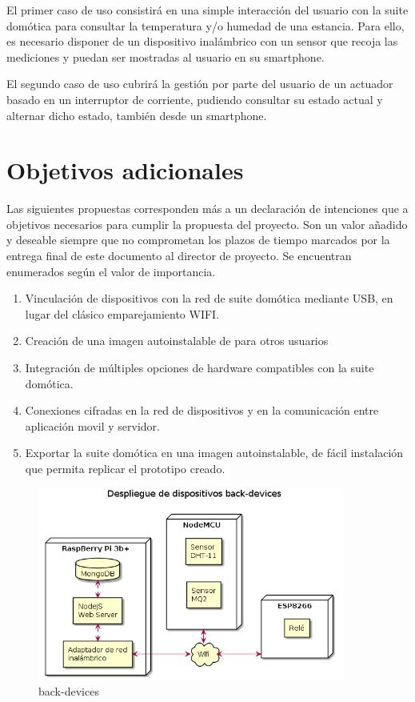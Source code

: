El primer caso de uso consistirá en una simple interacción del usuario con la suite domótica para consultar la temperatura y/o humedad de una estancia. Para ello, es necesario disponer de un dispositivo inalámbrico con un sensor que recoja las mediciones y puedan ser mostradas al usuario en su smartphone.

El segundo caso de uso cubrirá la gestión por parte del usuario de un actuador basado en un interruptor de corriente, pudiendo consultar su estado actual y alternar dicho estado, también desde un smartphone.

\section{Objetivos adicionales}
\label{ch:Capitulo3.7}

Las siguientes propuestas corresponden más a un declaración de intenciones que a objetivos necesarios para cumplir la propuesta del proyecto. Son un valor añadido y deseable siempre que no comprometan los plazos de tiempo marcados por la entrega final de este documento al director de proyecto. Se encuentran enumerados según el valor de importancia.

\begin{enumerate}

  \item Vinculación de dispositivos con la red de suite domótica mediante USB, en lugar del clásico emparejamiento WIFI.

  \item Creación de una imagen autoinstalable de para otros usuarios

  \item Integración de múltiples opciones de hardware compatibles con la suite domótica.

  \item Conexiones cifradas en la red de dispositivos y en la comunicación entre aplicación movil y servidor.

  \item Exportar la suite domótica en una imagen autoinstalable, de fácil instalación que permita replicar el prototipo creado.

\end{enumerate}

\begin{figure}[hbt!]
\centering
\includegraphics[height=2.5in]{figures/diagrams/physical-devices/back-devices.png}
\caption[back-devices]{back-devices\footnotemark}
\end{figure}

